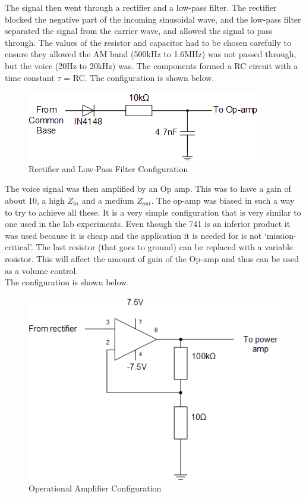 \documentclass[a4paper,10pt]{report}
\begin{document}
The signal then went through a rectifier and a low-pass filter.  The
rectifier blocked the negative part of the incoming sinusoidal wave,
and the low-pass filter separated the signal from the carrier wave,
and allowed the signal to pass through.  The values of the resistor
and capacitor had to be chosen carefully to ensure they allowed the AM
band (500kHz to 1.6MHz) was not passed through, but the voice (20Hz to
20kHz) was.  The components formed a RC circuit with a time constant
$\tau$ = RC.  The configuration is shown below.

\begin{figure}[htb]
  \centering
  \includegraphics[scale=0.7]{Rectifier}
  \caption{Rectifier and Low-Pass Filter Configuration}
\end{figure}

The voice signal was then amplified by an Op amp.  This was to have a
gain of about 10, a high $Z_{in}$ and a medium $Z_{out}$.  The op-amp
was biased in such a way to try to achieve all these.  It is a very
simple configuration that is very similar to one used in the lab
experiments.  Even though the 741 is an inferior product it was used
because it is cheap and the application it is needed for is not
`mission-critical'.  The last resistor (that goes to ground) can be
replaced with a variable resistor.  This will affect the amount of
gain of the Op-amp and thus can be used as a volume control.  \\ The
configuration is shown below.

\begin{figure}[htb]
  \centering
  \includegraphics[scale=0.7]{Op-amp}
  \caption{Operational Amplifier Configuration}
\end{figure}
\end{document}
